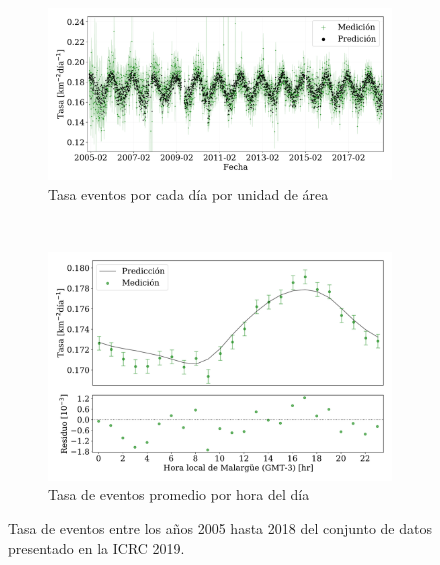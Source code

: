    \begin{figure}[H]
    \centering
       \begin{subfigure}[b]{0.9\textwidth}
       \includegraphics[width=\textwidth]{Graphs/rate_dayly/0EeV_ICRC_2019_S38_05_18.pdf}
       \caption{Tasa eventos por cada día por unidad de área}
       \label{fig:rate_day_ICRC_19_S38_05_18}
       \end{subfigure}\\%
       \begin{subfigure}[b]{0.9\textwidth}
       \includegraphics[width=\textwidth]{Graphs/rate_hour_of_the_day/S38_above_0EeV_hour_of_the_day.pdf}
       \caption{Tasa de eventos promedio por hora del día}
       \label{fig:rate_2015_ICRC_19_S38_05_18}
       \end{subfigure}%
       \caption{Tasa de eventos entre los años 2005 hasta 2018 del conjunto de datos presentado en la ICRC 2019.}\label{fig:rate_new_18_S38}
   \end{figure}

